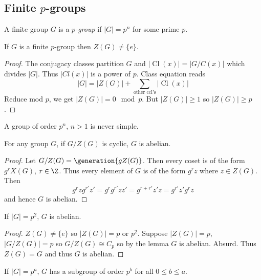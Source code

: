 \documentclass[a4paper]{article}
\DeclareMathOperator{\Cl}{Cl}
\begin{document}
\subsection{Finite \texorpdfstring{\(p\)}{p}-groups}

A finite group \(G\) is a \emph{\(p\)-group} if \(|G| = p^n\) for some prime \(p\).

\begin{theorem}
  If \(G\) is a finite \(p\)-group then \(Z(G) \neq \{e\}\).
\end{theorem}

\begin{proof}
  The conjugacy classes partition \(G\) and \(|\Cl(x)| = |G/C(x)|\) which divides \(|G|\). Thus \(|Cl(x)|\) is a power of \(p\). Class equation reads
  \[
    |G| = |Z(G)| + \sum_{\text{other ccl's}} |\Cl(x)|
  \]
  Reduce mod \(p\), we get \(|Z(G)| = 0 \mod p\). But \(|Z(G)| \geq 1\) so \(|Z(G)| \geq p\).
\end{proof}

\begin{corollary}
  A group of order \(p^n\), \(n > 1\) is never simple.
\end{corollary}

\begin{lemma}
  For any group \(G\), if \(G/Z(G)\) is cyclic, \(G\) is abelian.
\end{lemma}

\begin{proof}
  Let \(G/Z(G) = \generation{gZ(G)}\). Then every coset is of the form \(g^rX(G)\), \(r \in \Z\). Thus every element of \(G\) is of the form \(g^rz\) where \(z \in Z(G)\). Then
  \[
    g^rzg^{r'}z' = g^rg^{r'}zz' = g^{r + r'} z'z = g^{r'}z'g^rz
  \]
  and hence \(G\) is abelian.
\end{proof}

\begin{corollary}
  If \(|G| = p^2\), \(G\) is abelian.
\end{corollary}

\begin{proof}
  \(Z(G) \neq \{e\}\) so \(|Z(G)| = p\) or \(p^2\). Suppose \(|Z(G)| = p\), \(|G/Z(G)| = p\) so \(G/Z(G) \cong C_p\) so by the lemma \(G\) is abelian. Absurd. Thus \(Z(G) = G\) and thus \(G\) is abelian.
\end{proof}

\begin{theorem}
  If \(|G| = p^a\), \(G\) has a subgroup of order \(p^b\) for all \(0 \leq b \leq a\).
\end{theorem}
\end{document}
